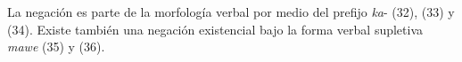 \textcolor{MidnightBlue}{\citep{Huichol}}

La negación es parte de la morfología verbal por medio del prefijo {\setmainfont{Charis SIL} \textit{ka}-} (32), (33) y (34). Existe también una negación existencial bajo la forma verbal supletiva {\setmainfont{Charis SIL} \textit{mawe}} (35) y (36).